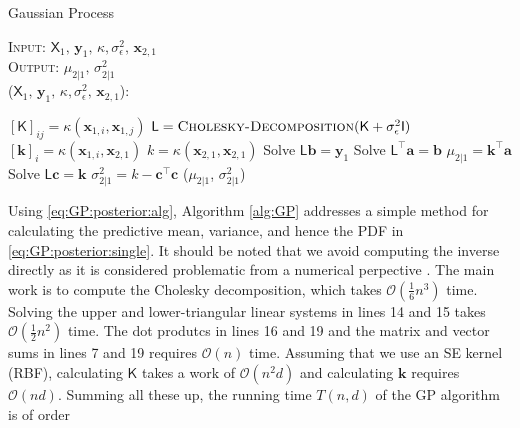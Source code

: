 \documentclass[10pt]{article}
\theoremstyle{definition}
\begin{document}
\begin{algorithm}[t!]
\caption{Gaussian Process}\label{alg:GP}
\hspace*{\algorithmicindent} {\scshape Input}: $\mathsf{X}_1, \, \mathbf{y}_1, \, \kappa, \sigma_{\epsilon}^2, \, \mathbf{x}_{2,1}$ \\
\hspace*{\algorithmicindent} {\scshape Output}: $\mu_{2|1}, \, \sigma_{2|1}^2$ \\
\hspace*{\algorithmicindent}{\scshape Gaussian-Process}($\mathsf{X}_1, \, \mathbf{y}_1, \, \kappa, \sigma_{\epsilon}^2, \, \mathbf{x}_{2,1}$):
\begin{algorithmic}[1]
        \State $[\mathsf{K}]_{ij} = \kappa(\mathbf{x}_{1,i}, \mathbf{x}_{1,j})$
    \EndFor
\EndFor
\State $\mathsf{L}= \text{{\scshape Cholesky-Decomposition}}(\mathsf{K}+\sigma_{\epsilon}^2\mathsf{I})$
    \State $[\mathbf{k}]_{i} = \kappa(\mathbf{x}_{1,i}, \mathbf{x}_{2,1})$
\EndFor
\State $k = \kappa(\mathbf{x}_{2,1}, \mathbf{x}_{2,1})$
\State Solve $\mathsf{L} \mathbf{b} = \mathbf{y}_1$
\State Solve $\mathsf{L}^{\top} \mathbf{a} = \mathbf{b}$
\State $\mu_{2|1} = \mathbf{k}^{\top}\mathbf{a}$
\State Solve $\mathsf{L} \mathbf{c} = \mathbf{k}$
\State $\sigma_{2|1}^2=k-\mathbf{c}^{\top}\mathbf{c}$
\State \Return ($\mu_{2|1}$, $\sigma_{2|1}^2$)
\end{algorithmic}
\end{algorithm}
Using \cref{eq:GP:posterior:alg}, Algorithm \ref{alg:GP} addresses a simple method for calculating the predictive mean, variance, and hence the PDF in \cref{eq:GP:posterior:single}.  It should be noted that we avoid computing the inverse directly as it is considered problematic from a numerical perpective \cite[Section 4.7]{Gill1991}. The main work is to compute the Cholesky decomposition, which takes $\mathcal{O}(\frac{1}{6}n^3)$ time. Solving the upper and lower-triangular linear systems in lines 14 and 15 takes $\mathcal{O}(\frac{1}{2}n^2)$ time. The dot produtcs in lines 16 and 19  and the matrix and vector sums in lines 7 and 19 requires $\mathcal{O}(n)$ time. Assuming that we use an SE kernel (RBF), calculating $\mathsf{K}$ takes a work of $\mathcal{O}(n^2d)$ and calculating $\mathbf{k}$ requires $\mathcal{O}(nd)$. Summing all these up, the running time $T(n,d)$ of the GP algorithm is of order
\end{document}
